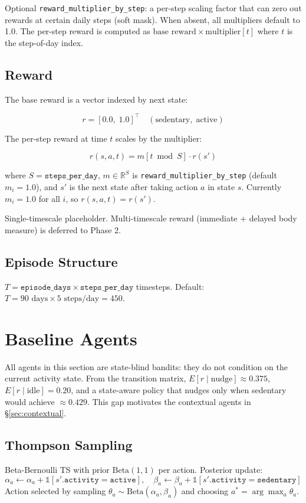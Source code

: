 \documentclass[11pt]{article}
\begin{document}
Optional \texttt{reward\_multiplier\_by\_step}: a per-step scaling factor that can zero out rewards at certain daily steps (soft mask). When absent, all multipliers default to 1.0. The per-step reward is computed as $\text{base reward} \times \text{multiplier}[t]$ where $t$ is the step-of-day index.

\subsection{Reward}\label{sec:reward}

The base reward is a vector indexed by next state:

\[
r = [0.0,\; 1.0]^\top \quad (\text{sedentary},\; \text{active})
\]

The per-step reward at time $t$ scales by the multiplier:

\[
r(s, a, t) = m[t \bmod S] \cdot r(s')
\]

where $S = \texttt{steps\_per\_day}$, $m \in \mathbb{R}^S$ is \texttt{reward\_multiplier\_by\_step}
(default $m_i = 1.0$), and $s'$ is the next state after taking action $a$ in state $s$.
Currently $m_i = 1.0$ for all $i$, so $r(s, a, t) = r(s')$.

Single-timescale placeholder. Multi-timescale reward (immediate + delayed body measure) is deferred to Phase 2.

\subsection{Episode Structure}
$T = \texttt{episode\_days} \times \texttt{steps\_per\_day}$ timesteps. Default: $T = 90 \text{ days} \times 5 \text{ steps/day} = 450$.

\section{Baseline Agents}

All agents in this section are state-blind bandits: they do not condition on the current activity state. From the transition matrix,
$E[r \mid \text{nudge}] \approx 0.375$, $E[r \mid \text{idle}] = 0.20$, and a
state-aware policy that nudges only when sedentary would achieve $\approx 0.429$.
This gap motivates the contextual agents in \S\ref{sec:contextual}.

\subsection{Thompson Sampling}
Beta-Bernoulli TS with prior $\text{Beta}(1, 1)$ per action. Posterior update:
\[
\alpha_a \leftarrow \alpha_a + \mathbb{1}[s'.\texttt{activity} = \texttt{active}], \quad
\beta_a \leftarrow \beta_a + \mathbb{1}[s'.\texttt{activity} = \texttt{sedentary}]
\]
Action selected by sampling $\theta_a \sim \text{Beta}(\alpha_a, \beta_a)$ and choosing $a^* = \arg\max_a \theta_a$.
\end{document}
